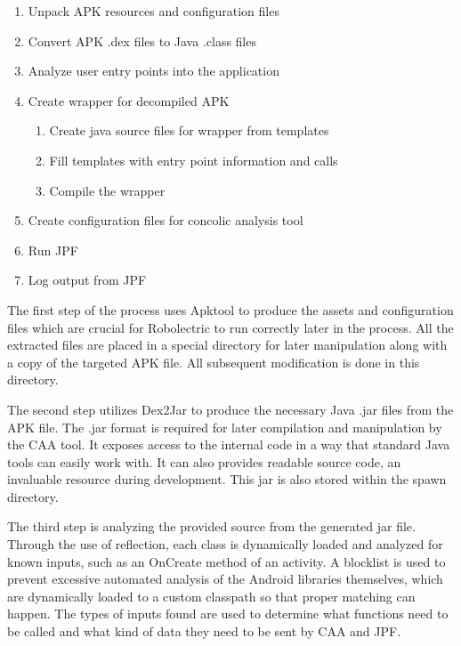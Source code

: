 \documentclass{sig-alternate}
\begin{document}
\begin{enumerate}

    \setlength{\itemsep}{0pt} %
    \setlength{\parskip}{0pt} %
    \setlength{\parsep}{0pt}  %

 \item Unpack APK resources and configuration files
 \item Convert APK .dex files to Java .class files
  \item Analyze user entry points into the application
 \item Create wrapper for decompiled APK
 \begin{enumerate}
\itemsep-.2em %
 	\item Create java source files for wrapper from templates
 	\item Fill templates with entry point information and calls
 	\item Compile the wrapper
 \end{enumerate}
 \item Create configuration files for concolic analysis tool
 \item Run JPF
 \item Log output from JPF
 \end{enumerate}



The first step of the process uses Apktool to produce the assets and configuration files which are crucial for Robolectric to run correctly later in the process. All the extracted files are placed in a special directory for later manipulation along with a copy of the targeted APK file.  All subsequent modification is done in this directory.

The second step utilizes Dex2Jar to produce the necessary Java .jar files from the APK file. The .jar format is required for later compilation and manipulation by the CAA tool. It exposes access to the internal code in a way that standard Java tools can easily work with.  It can also provides readable source code, an invaluable resource during development. This jar is also stored within the spawn directory.

The third step is analyzing the provided source from the generated jar file. Through the use of reflection, each class is dynamically loaded and analyzed for known inputs, such as an OnCreate method of an activity. A blocklist is used to prevent excessive automated analysis of the Android libraries themselves, which are dynamically loaded to a custom classpath so that proper matching can happen.  The types of inputs found are used to determine what functions need to be called and what kind of data they need to be sent by CAA and JPF. 
\end{document}
